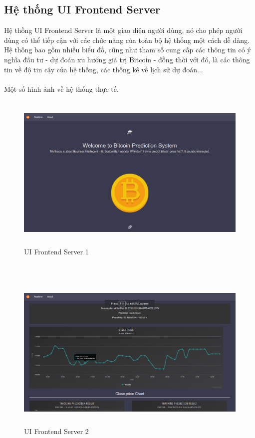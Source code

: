 \subsection{Hệ thống UI Frontend Server}
Hệ thồng UI Frontend Server là một giao diện người dùng, nó cho phép người 
dùng có thể tiếp cận với các chức năng của toàn bộ hệ thống một cách dễ dàng. 
Hệ thống bao gồm nhiều biểu đồ, cũng như tham số cung cấp các thông tin có ý 
nghĩa đầu tư - dự đoán xu hướng giá trị Bitcoin - đồng thời với đó, là các 
thông tin về độ tin cậy của hệ thống, các thống kê về lịch sử dự đoán...\\\\
Một số hình ảnh về hệ thống thực tế.\\
\begin{figure}[h!]
\centering
\includegraphics[height=3in, keepaspectratio=true]{1.png}
\caption{UI Frontend Server 1}
\end{figure}\\
\begin{figure}[h!]
\centering
\includegraphics[height=3in, keepaspectratio=true]{2.png}
\caption{UI Frontend Server 2}
\end{figure}\\\\
